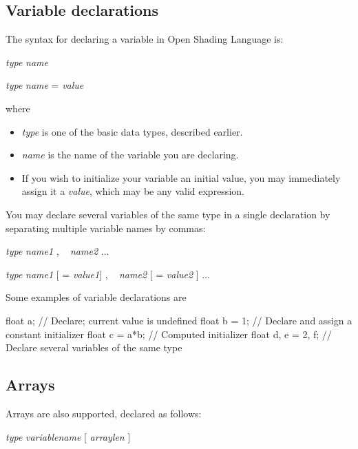\documentclass[11pt,letterpaper]{book}
\def\langname{Open Shading Language\xspace}
\begin{document}
\subsection{Variable declarations}
\label{sec:vardecls}

The syntax for declaring a variable in \langname is:

\vspace{12pt}
\spc \emph{type} \emph{name} 

\spc \emph{type} \emph{name} = \emph{value}
\vspace{12pt}

\noindent where

\begin{itemize}
\item \emph{type} is one of the basic data types, described earlier.
\item \emph{name} is the name of the variable you are declaring.
\item If you wish to initialize your variable an initial value, you may
immediately assign it a \emph{value}, which may be any valid expression.
\end{itemize}

You may declare several variables of the same type in a single
declaration by separating multiple variable names by commas:

\vspace{12pt}
\spc \emph{type} \emph{name1} {\cf ,} ~ \emph{name2} ...

\spc \emph{type} \emph{name1} [ = \emph{value1}] {\cf ,} ~ \emph{name2} [ =
  \emph{value2} ] ...
\vspace{12pt}


\noindent Some examples of variable declarations are

\begin{code}
    float a;           // Declare; current value is undefined
    float b = 1;       // Declare and assign a constant initializer
    float c = a*b;     // Computed initializer
    float d, e = 2, f; // Declare several variables of the same type
\end{code}

\subsection{Arrays}
 

Arrays are also supported, declared as follows:

\vspace{12pt}
\spc \emph{type} \emph{variablename}
 {\cf [} \emph{arraylen} {\cf ]}
\end{document}

